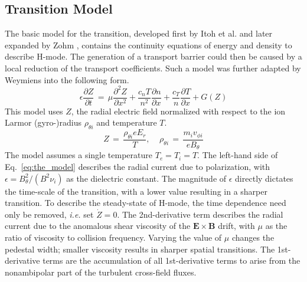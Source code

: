 \documentclass[a4paper]{article}
\begin{document}


\subsection{Transition Model}
The basic model for the transition, developed first by Itoh et al. \cite{itoh_edge_1991} and later expanded by Zohm \cite{zohm_dynamic_1994}, contains the continuity equations of energy and density to describe H-mode.
The generation of a transport barrier could then be caused by a local reduction of the transport coefficients.
Such a model was further adapted by Weymiens \cite{weymiens_bifurcation_2014} into the following form.
\begin{equation}
	\epsilon \frac{\partial Z}{\partial t} \,=\, \mu \frac{\partial^2 Z}{\partial x^2} + \frac{c_n T}{n^2} \frac{\partial n}{\partial x} + \frac{c_T}{n} \frac{\partial T}{\partial x} + G(Z)
	\label{eq:the_model}
\end{equation}
This model uses $Z$, the radial electric field normalized with respect to the ion Larmor (gyro-)radius $\rho_{\theta i}$ and temperature $T$.
\begin{equation}
	Z \,=\, \frac{\rho_{\theta i} e E_r}{T}, ~~~~~ \rho_{\theta i} \,=\, \frac{m_i v_{\phi i}}{e B_\theta}
	\label{eq:normalization}
\end{equation}
The model assumes a single temperature $T_e = T_i = T$.
The left-hand side of Eq.~\ref{eq:the_model} describes the radial current due to polarization, with $\epsilon = B_\theta^2 / (B^2 \nu_i)$ as the dielectric constant.
The magnitude of $\epsilon$ directly dictates the time-scale of the transition, with a lower value resulting in a sharper transition.
To describe the steady-state of H-mode, the time dependence need only be removed, \emph{i.e.} set $\dot{Z} = 0$.
The 2nd-derivative term describes the radial current due to the anomalous shear viscosity of the $\mathbf{E}\times\mathbf{B}$ drift, with $\mu$ as the ratio of viscosity to collision frequency.
Varying the value of $\mu$ changes the pedestal width; smaller viscosity results in sharper spatial transitions.
The 1st-derivative terms are the accumulation of all 1st-derivative terms to arise from the nonambipolar part of the turbulent cross-field fluxes.
\end{document}
